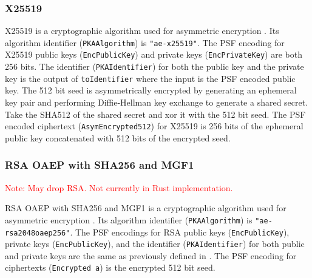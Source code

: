 \documentclass{article}
\newcommand{\todo}[1]{\textcolor{red}{#1}}
\begin{document}
\subsubsection{X25519}

X25519 is a cryptographic algorithm used for asymmetric encryption \cite{rfc7748}. 
Its algorithm identifier (\texttt{PKAAlgorithm}) is \texttt{"ae-x25519"}. 
The PSF encoding for X25519 public keys (\texttt{EncPublicKey}) and private keys (\texttt{EncPrivateKey}) are both 256 bits. 
The identifier (\texttt{PKAIdentifier}) for both the public key and the private key is the output of \texttt{toIdentifier} where the input is the PSF encoded public key. 
The 512 bit seed is asymmetrically encrypted by generating an ephemeral key pair and performing Diffie-Hellman key exchange to generate a shared secret. 
Take the SHA512 of the shared secret and xor it with the 512 bit seed. 
The PSF encoded ciphertext (\texttt{AsymEncrypted512}) for X25519 is 256 bits of the ephemeral public key concatenated with 512 bits of the encrypted seed. 

\subsubsection{RSA OAEP with SHA256 and MGF1}

\todo{Note: May drop RSA. Not currently in Rust implementation.}

RSA OAEP with SHA256 and MGF1 is a cryptographic algorithm used for asymmetric encryption \cite{rfc3447}. %
Its algorithm identifier (\texttt{PKAAlgorithm}) is \texttt{"ae-rsa2048oaep256"}. 
The PSF encodings for RSA public keys (\texttt{EncPublicKey}), private keys (\texttt{EncPublicKey}), and the identifier (\texttt{PKAIdentifier}) for both public and private keys are the same as previously defined in . 
The PSF encoding for ciphertexts (\texttt{Encrypted a}) is the encrypted 512 bit seed. 



%
%
%
%
%
\end{document}
